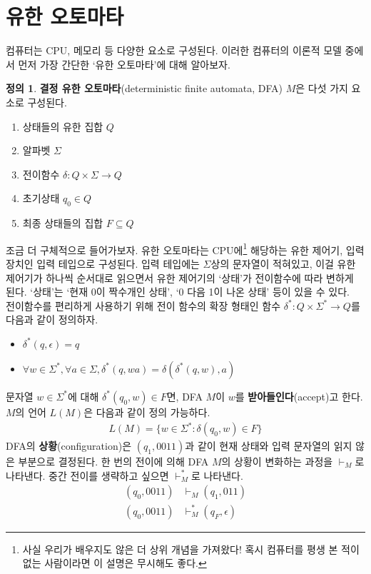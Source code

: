 \documentclass[b5paper, 11pt]{book}
\theoremstyle{definition}
\newtheorem{defn}{정의}[chapter]
\begin{document}
\section{유한 오토마타}
컴퓨터는 CPU, 메모리 등 다양한 요소로 구성된다. 이러한 컴퓨터의 이론적 모델 중에서 먼저 가장 간단한 `유한 오토마타'에 대해 알아보자.
\begin{defn}
    \textbf{결정 유한 오토마타}(deterministic finite automata, DFA) $M$은 다섯 가지
요소로 구성된다.
\begin{enumerate}
    \item 상태들의 유한 집합 $Q$
    \item 알파벳 $\Sigma$
    \item 전이함수 $\delta : Q \times \Sigma \rightarrow Q$
    \item 초기상태 $q_0 \in Q$
    \item 최종 상태들의 집합 $F \subseteq Q$
\end{enumerate}
\end{defn}
조금 더 구체적으로 들어가보자. 유한 오토마타는 CPU에\footnote{사실 우리가 배우지도 않은 더 상위 개념을 가져왔다! 혹시 컴퓨터를 평생 본 적이 없는 사람이라면 이 설명은 무시해도 좋다.} 해당하는 유한 제어기, 입력장치인 입력 테입으로 구성된다. 입력 테입에는 $\Sigma$상의 문자열이 적혀있고, 이걸 유한 제어기가 하나씩 순서대로 읽으면서 유한 제어기의 `상태'가 전이함수에 따라 변하게 된다. `상태'는 `현재 0이 짝수개인 상태', `0 다음 1이 나온 상태' 등이 있을 수 있다. \\
전이함수를 편리하게 사용하기 위해 전이 함수의 확장 형태인 함수 $\delta^*: Q \times \Sigma^{*} 
\rightarrow Q$를 다음과 같이 정의하자.
\begin{itemize}
    \item $\delta^* (q, \epsilon) = q$
    \item $\forall w \in \Sigma^*, \forall a \in \Sigma, \delta^* (q, wa) = \delta(\delta^*(q,w),a)$
\end{itemize}
문자열 $w \in \Sigma^*$에 대해 $\delta^* (q_0, w ) \in F$면, DFA $M$이 $w$를 \textbf{받아들인다}(accept)고 한다. $M$의 언어 $L(M)$은 다음과 같이 정의 가능하다.
\begin{align*}
    L(M) = \{w \in \Sigma^* : \delta (q_0, w) \in F \}
\end{align*}
DFA의 \textbf{상황}(configuration)은 $(q_1, 0011)$과 같이 현재 상태와 입력 문자열의 읽지 않은 부분으로 결정된다. 한 번의 전이에 의해 DFA $M$의 상황이 변화하는 과정을 $\vdash_M$로 나타낸다. 중간 전이를 생략하고 싶으면 $\vdash_M^*$로 나타낸다.
\begin{align*}
    (q_0, 0011) &\vdash_M (q_1, 011) \\
    (q_0, 0011) &\vdash_M^* (q_F, \epsilon)
\end{align*}
\end{document}
